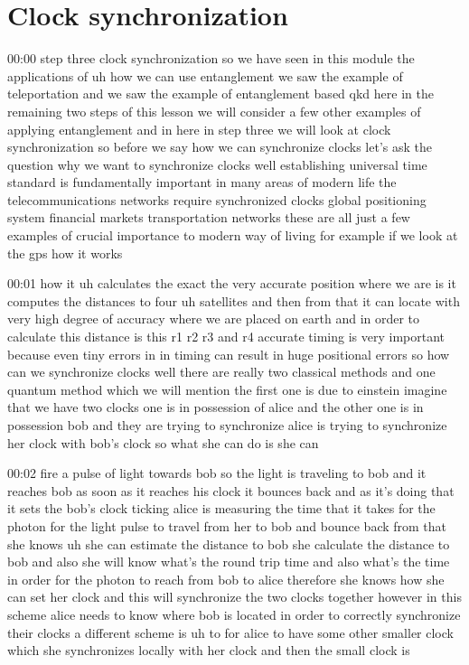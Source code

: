 \section{Clock synchronization}

00:00
step three clock synchronization so we have seen in this module the
applications of uh how we can use entanglement we saw the
example of teleportation and we saw the example of entanglement
based qkd here in the remaining two steps of this lesson we will consider a
few other examples of applying entanglement and in
here in step three we will look at clock synchronization
so before we say how we can synchronize clocks
let's ask the question why we want to synchronize clocks
well establishing universal time standard is fundamentally important
in many areas of modern life the telecommunications networks require
synchronized clocks global positioning system financial
markets transportation networks these are all just a few examples of
crucial importance to modern way of living
for example if we look at the gps how it works

00:01
how it uh calculates the exact the very accurate position where we are is
it computes the distances to four uh satellites
and then from that it can locate with very high degree of accuracy
where we are placed on earth and in order to calculate this distance is
this r1 r2 r3 and r4 accurate timing is very important because even tiny errors
in in timing can result in huge positional errors
so how can we synchronize clocks well there are really two classical methods
and one quantum method which we will mention
the first one is due to einstein imagine that we have two clocks
one is in possession of alice and the other one is in possession bob
and they are trying to synchronize alice is trying to synchronize
her clock with bob's clock so what she can do is she can

00:02
fire a pulse of light towards bob so the light is traveling to bob and it
reaches bob as soon as it reaches his clock it bounces back and as it's
doing that it sets the bob's clock ticking alice is measuring the time that it
takes for the photon for the light pulse to travel from her to bob and bounce
back from that she knows uh she can estimate
the distance to bob she calculate the distance to bob
and also she will know what's the round trip time and also what's the
time in order for the photon to reach from bob to alice
therefore she knows how she can set her clock
and this will synchronize the two clocks together
however in this scheme alice needs to know where bob is located
in order to correctly synchronize their clocks
a different scheme is uh to for alice to have some other
smaller clock which she synchronizes locally
with her clock and then the small clock is

